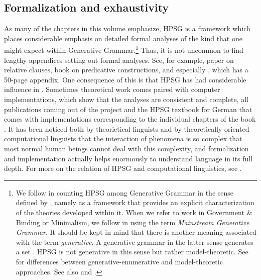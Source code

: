 \documentclass[output=paper
                ,modfonts
                ,nonflat
	        ,collection
	        ,collectionchapter
	        ,collectiontoclongg
 	        ,biblatex
                ,babelshorthands
                ,newtxmath
                ,draftmode
                ,colorlinks, citecolor=brown
]{./langsci/langscibook}
\begin{document}
\subsection{Formalization and exhaustivity}
\label{sec-form-exhaust}

As many of the chapters in this volume emphasize, HPSG is a framework which places considerable
emphasis on detailed formal analyses of the kind that one might expect within Generative
Grammar.\footnote{%
We follow \citet[]{GSag2000a-u} in counting HPSG among Generative Grammar in the sense
defined by \citet[]{Chomsky65a}, namely as a framework that provides an explicit
characterization of the theories developed within it.
When we refer to work in Government \& Binding or Minimalism, we follow \citet[]{CJ2005a} in using
the term \emph{Mainstream Generative Grammar}. It should be kept in mind that there is another
meaning associated with the term \emph{generative}. A generative grammar in the latter sense
generates a set \citep[]{Chomsky57a}. HPSG is not generative in this sense but rather model-theoretic. See \citet{PS2001a}
for differences between generative-enumerative and model-theoretic approaches. See also
 and .
}
Thus, it is not uncommon to find lengthy appendices setting out formal analyses. See, for
example,  paper on  relative clauses,
 book on predicative constructions, and especially \citet{GSag2000a-u},
which has a 50-page appendix. One consequence of this is that HPSG has had 
considerable influence in . Sometimes theoretical work comes paired
with computer implementations, which show that the analyses are consistent and complete, \eg all
publications coming out of the  project \citep{MuellerCoreGram} and the HPSG textbook
for German that comes with implementations corresponding to the individual chapters of the book
\citep{MuellerGrammix}. It has been noticed both by theorietical linguists \citep[]{Bierwisch63a} and
by theoretically-oriented computational linguists \citep[]{Abney96a} that the interaction of phenomena
is so complex that most normal human beings cannot deal with this complexity, and formalization and
implementation actually helps enormously to understand language in its full depth. For more on the
relation of HPSG and computational linguistics, see .
\end{document}
